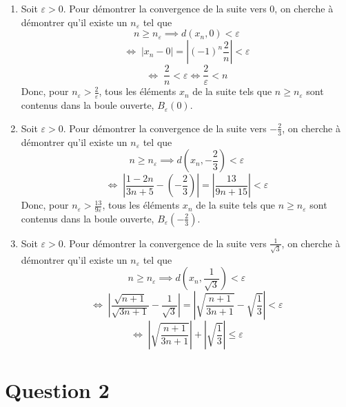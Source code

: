 \documentclass[letterpaper,12pt,oneside,final]{book}
\begin{document}
\begin{enumerate}[(1)]

\item %
Soit $\varepsilon > 0$. Pour démontrer la convergence de la suite vers $0$, on cherche à démontrer qu'il existe un $n_\varepsilon$ tel que
\[
 n \geq n_\varepsilon \implies d\left( x_n, 0 \right) < \varepsilon
\]
\[
\iff \; \left| x_n - 0 \right| = \left\vert (-1)^{n}\frac{2}{n} \right\vert < \varepsilon
\]
\[
\iff \; \frac{2}{n} < \varepsilon \iff \frac{2}{\varepsilon } < n
\]
Donc, pour $n_\varepsilon > \frac{2}{\varepsilon}$, tous les éléments $x_n$ de la
suite tels que $n\geq n_\varepsilon$ sont contenus dans la boule ouverte, $B_\varepsilon(0)$.

\item %

Soit $\varepsilon > 0$. Pour démontrer la convergence de la suite vers $-\frac{2}{3}$, on cherche à démontrer qu'il existe un $n_\varepsilon$ tel que
\[
n \geq n_\varepsilon \implies d\left( x_n, -\frac{2}{3} \right) < \varepsilon
\] %
\[
\iff \; \left| \frac{1-2n}{3n+5} -\left(-\frac{2}{3}\right) \right| = \left|\frac{13}{9n+15} \right|  < \varepsilon    
\]
Donc, pour $n_\varepsilon > \frac{13}{9\varepsilon} $, tous les éléments $x_n$ de la
suite tels que $n\geq n_\varepsilon$ sont contenus dans la boule ouverte, $B_\varepsilon\left(-\frac{2}{3}\right)$.    
\item %
Soit $\varepsilon > 0$. Pour démontrer la convergence de la suite vers $\frac{1}{\sqrt{3}}$, on cherche à démontrer qu'il existe un $n_\varepsilon$ tel que
\[
n \geq n_{\varepsilon} \implies d\left(x_{n},\frac{1}{\sqrt{3}}\right) < \varepsilon 
\]
\[
\iff\; \left| \frac{\sqrt{n+1}}{\sqrt{3n+1}} - \frac{1}{\sqrt{3}} \right| = \left| \sqrt{\frac{n+1}{3n+1}} - \sqrt{\frac{1}{3}} \right| < \varepsilon  
\]
\[\iff \; \left| \sqrt{\frac{n+1}{3n+1}} \right| + \left| \sqrt{\frac{1}{3}} \right|  \leq \varepsilon 
\]




\end{enumerate}





\newpage
\section*{Question 2}
\end{document}
